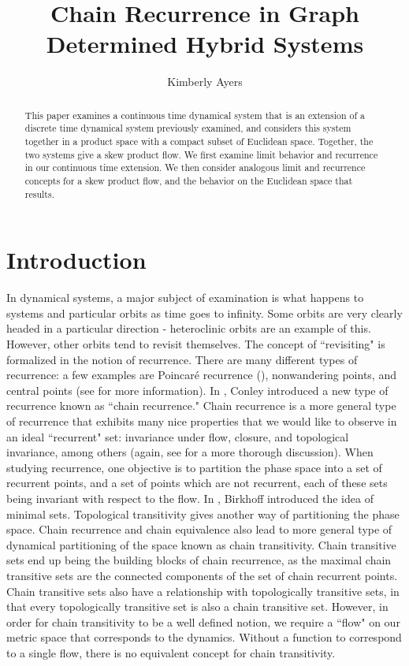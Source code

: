 \documentclass[11pt]{article}
\title{Chain Recurrence in Graph Determined Hybrid Systems}
\author{Kimberly Ayers}
\date{}
\begin{document}
\maketitle

\begin{abstract}
This paper examines a continuous time dynamical system that is an extension of a discrete time dynamical system previously examined, and considers this system together in a product space with a compact subset of Euclidean space. Together, the two systems give a skew product flow.  We first examine limit behavior and recurrence in our continuous time extension.  We then consider analogous limit and recurrence concepts for a skew product flow, and the behavior on the Euclidean space that results. 
\end{abstract}
\section{Introduction}
\vspace{2mm}

\indent In dynamical systems, a major subject of examination is what happens to systems and particular orbits as time goes to infinity.  Some orbits are very clearly headed in a particular direction - heteroclinic orbits are an example of this.  However, other orbits tend to revisit themselves.  The concept of ``revisiting" is formalized in the notion of recurrence.  There are many different types of recurrence: a few examples are Poincar\'e recurrence (\cite{poincare}), nonwandering points, and central points (see \cite{Alongi} for more information).  In \cite{conley}, Conley introduced a new type of recurrence known as ``chain recurrence."  Chain recurrence is a more general type of recurrence that exhibits many nice properties that we would like to observe in an ideal ``recurrent" set: invariance under flow, closure, and topological invariance, among others (again, see \cite{Alongi} for a more thorough discussion).  When studying recurrence, one objective is to partition the phase space into a set of recurrent points, and a set of points which are not recurrent, each of these sets being invariant with respect to the flow.  In \cite{birkhoff1}, Birkhoff introduced the idea of minimal sets.  Topological transitivity gives another way of partitioning the phase space.  Chain recurrence and chain equivalence also lead to more general type of dynamical partitioning of the space known as chain transitivity.    Chain transitive sets end up being the building blocks of chain recurrence, as the maximal chain transitive sets are the connected components of the set of chain recurrent points. Chain transitive sets also have a relationship with topologically transitive sets, in that every topologically transitive set is also a chain transitive set.  However, in order for chain transitivity to be a well defined notion, we require a ``flow" on our metric space that corresponds to the dynamics.  Without a function to correspond to a single flow, there is no equivalent concept for chain transitivity.
\end{document}
